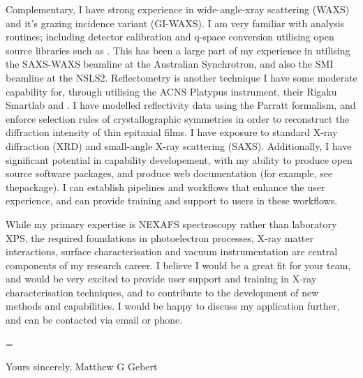 \documentclass[10pt,a4paper,ragged2e,withhyper,paragraphstrue]{altacv}
\newcommand{\textalignment}{
	\justifying
    \tolerance=1 %
    \emergencystretch=\maxdimen
    \hyphenpenalty=10000 
    \hbadness=10000
}
\begin{document}
{    Complementary, I have strong experience in wide-angle-xray scattering (WAXS) and it's grazing incidence variant (GI-WAXS). I am very familiar with analysis routines; including detector calibration and q-space conversion utilising open source libraries such as . This has been a large part of my experience in utilising the SAXS-WAXS beamline at the Australian Synchrotron, and also the SMI beamline at the NSLS2. Reflectometry is another technique I have some moderate capability for, through utilising the ACNS Platypus instrument, their Rigaku Smartlab and . I have modelled reflectivity data using the Parratt formalism, and enforce selection rules of crystallographic symmetries in order to reconstruct the diffraction intensity of thin epitaxial films. I have exposure to standard X-ray diffraction (XRD) and small-angle X-ray scattering (SAXS).
    Additionally, I have significant potential in capability developement, with my ability to produce open source software packages, and produce web documentation (for example, see thepackage). I can establish pipelines and workflows that enhance the user experience, and can provide training and support to users in these workflows.

    While my primary expertise is NEXAFS spectroscopy rather than laboratory XPS, the required foundations in photoelectron processes, X-ray matter interactions, surface characterisation and vacuum instrumentation are central components of my research career. I believe I would be a great fit for your team, and would be very excited to provide user support and training in X-ray characterisation techniques, and to contribute to the development of new methods and capabilities. I would be happy to discuss my application further, and can be contacted via email or phone.
    }

    {\color{emphasis}
    \textalignment
		
    \vspace{0.5em}

    Yours sincerely, \newline
    {\color{emphasis}\hspace{0.5cm}Matthew G Gebert}

    }
    
    \divider
\end{document}
